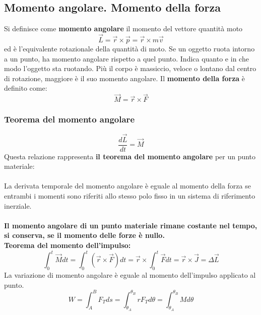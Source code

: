 \documentclass{article}
\numberwithin{equation}{subsection}
\begin{document}
\subsection{Momento angolare. Momento della forza}
Si definisce come \textbf{momento angolare} il momento del vettore quantità moto
\begin{equation}
    \vec{L}= \vec{r} \times \vec{p} = \vec{r} \times m\vec{v}
\end{equation}
ed è l'equivalente rotazionale della quantità di moto. Se un oggetto ruota intorno a un punto, ha momento angolare rispetto a quel punto. Indica quanto e in che modo l’oggetto sta ruotando. Più il corpo è massiccio, veloce o lontano dal centro di rotazione, maggiore è il suo momento angolare.
Il \textbf{momento della forza} è definito come:
\begin{equation}
    \vec{M} = \vec{r} \times \vec{F}
\end{equation}
\subsubsection{Teorema del momento angolare}
\begin{equation}
    \frac{d\vec{L}}{dt}=\vec{M}
\end{equation}
Questa relazione rappresenta \textbf{il teorema del momento angolare} per un punto materiale:\\\\
La derivata temporale del momento angolare è eguale al momento della forza se entrambi i momenti sono riferiti allo stesso polo fisso in un sistema di riferimento inerziale.\\\\
\textbf{Il momento angolare di un punto materiale rimane costante nel tempo, si conserva, se il momento delle forze è nullo.}\\
\textbf{Teorema del momento dell'impulso:}
\begin{equation}
    \int_0^t \vec{M}dt = \int_0^t (\vec{r} \times \vec{F})dt = \vec{r} \times \int_0^t \vec{F} dt = \vec{r} \times \vec{J} = \Delta \vec{L}
\end{equation}
La variazione di momento angolare è eguale al momento dell'impulso applicato al punto.
\begin{equation}
    W=\int_A^B F_T ds = \int_{\theta_A}^{\theta_B} rF_T d\theta=\int_{\theta_A}^{\theta_B} M d\theta
\end{equation}
\end{document}

